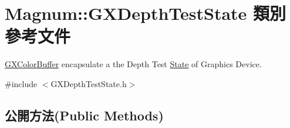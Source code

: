 \hypertarget{class_magnum_1_1_g_x_depth_test_state}{}\section{Magnum\+:\+:G\+X\+Depth\+Test\+State 類別 參考文件}
\label{class_magnum_1_1_g_x_depth_test_state}


\hyperlink{class_magnum_1_1_g_x_color_buffer}{G\+X\+Color\+Buffer} encapsulate a the Depth Test \hyperlink{class_magnum_1_1_state}{State} of Graphics Device.  




{\ttfamily \#include $<$G\+X\+Depth\+Test\+State.\+h$>$}

\subsection*{公開方法(Public Methods)}
